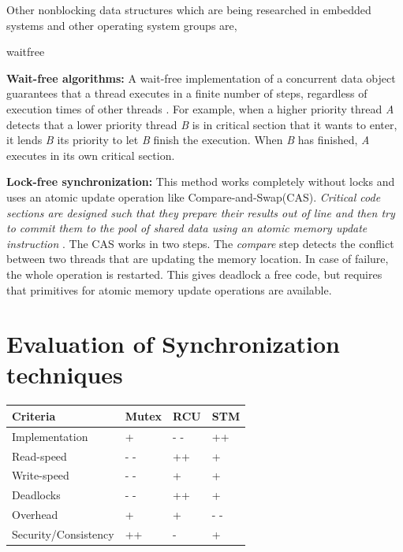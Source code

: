 Other nonblocking data structures which are being researched in embedded systems and other operating system groups are, 

\begin{labeling}{waitfree}
\item[\textbf{Wait-free algorithms:}] A wait-free implementation of a concurrent data object guarantees that a thread executes in a finite number of steps, regardless of execution times of other threads  \cite{herlihy1991wait}. For example, when a higher priority thread \textit{A} detects that a lower priority thread \textit{B} is in critical section that it wants to enter, it lends \textit{B} its priority to let \textit{B} finish the execution. When \textit{B} has finished, \textit{A} executes in its own critical section.


\item [\textbf{Lock-free synchronization:}] This method works completely without locks and uses an atomic update operation like Compare-and-Swap(CAS). \textit{Critical code sections are designed such that they prepare their results out of line and then try to commit them to the pool of shared data using an atomic memory update instruction} \cite{hohmuth2001pragmatic}. The CAS works in two steps. The \textit{compare} step detects the conflict between two threads that are updating the memory location. In case of failure, the whole operation is restarted. This gives deadlock a free code, but requires that primitives for atomic memory update operations are available.
\end{labeling}



\section{Evaluation of Synchronization techniques}

\begin{center}
\begin{tabular}{|l|l|l|p{3cm}|}
\hline 
\textbf{Criteria} & \textbf{Mutex} & \textbf{RCU} & \textbf{STM} \\ \hline

Implementation & + & - - & ++ \\ \hline

Read-speed & - - & ++ & + \\ \hline

Write-speed & - - & + & + \\ \hline

Deadlocks & - - & ++ & + \\ \hline

Overhead & + & + & - - \\ \hline

Security/Consistency & ++ & - & + \\ \hline
\end{tabular}
\label{tab:lock}
\end{center}

